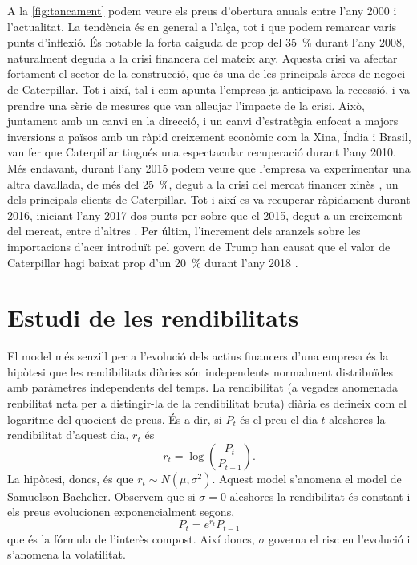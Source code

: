 \documentclass{article}
\numberwithin{table}{section}
\numberwithin{figure}{section}
\numberwithin{equation}{section}
\begin{document}
A la \cref{fig:tancament} podem veure els preus d'obertura anuals entre l'any 2000 i l'actualitat. La tendència és en general a l'alça, tot i que podem remarcar varis punts d'inflexió. És notable la forta caiguda de prop del \SI{35}{\percent} durant l'any 2008, naturalment deguda a la crisi financera del mateix any. Aquesta crisi va afectar fortament el sector de la construcció, que és una de les principals àrees de negoci de Caterpillar. Tot i així, tal i com apunta \cite{recupera} l'empresa ja anticipava la recessió, i va prendre una sèrie de mesures que van alleujar l'impacte de la crisi. Això, juntament amb un canvi en la direcció, i un canvi d'estratègia enfocat a majors inversions a països amb un ràpid creixement econòmic com la Xina, Índia i Brasil, van fer que Caterpillar tingués una espectacular recuperació durant l'any 2010.
Més endavant, durant l'any 2015 podem veure que l'empresa va experimentar una altra davallada, de més del \SI{25}{\percent}, degut a la crisi del mercat financer xinès \cite{xina}, un dels principals clients de Caterpillar. Tot i així es va recuperar ràpidament durant 2016, iniciant l'any 2017 dos punts per sobre que el 2015, degut a un creixement del mercat, entre d'altres \cite{crush}. Per últim, l'increment dels aranzels sobre les importacions d'acer introduït pel govern de Trump han causat que el valor de Caterpillar hagi baixat prop d'un \SI{20}{\percent} durant l'any 2018 \cite{trump}.


\section{Estudi de les rendibilitats}
El model més senzill per a l'evolució dels actius financers d'una empresa és la hipòtesi que les rendibilitats diàries són independents normalment distribuïdes amb paràmetres independents del temps. La rendibilitat (a vegades anomenada renbilitat neta per a distingir-la de la rendibilitat bruta) diària es defineix com el logaritme del quocient de preus. És a dir, si \( P_t \) és el preu el dia \( t \) aleshores la rendibilitat d'aquest dia, \( r_t \) és
\begin{equation}
	r_t = \log{\left(\frac{P_t}{P_{t-1}}\right)}.
	\label{eq:rend}
\end{equation}
La hipòtesi, doncs, és que \( r_t \sim N(\mu, \sigma^2) \). Aquest model s'anomena el model de Samuelson-Bachelier. Observem que si \( \sigma = 0 \) aleshores la rendibilitat és constant i els preus evolucionen exponencialment segons,
\begin{equation*}
	P_t = e^{r_t}P_{t-1}
\end{equation*}
que és la fórmula de l'interès compost. Així doncs, \( \sigma \) governa el risc en l'evolució i s'anomena la volatilitat. \\
\end{document}
